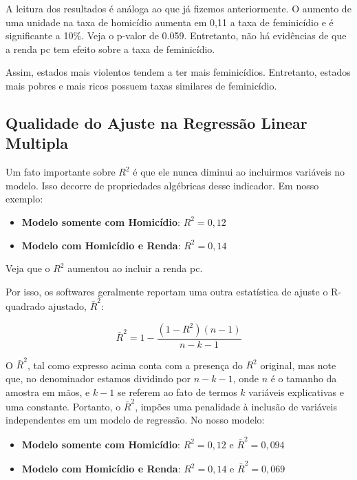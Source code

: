 \documentclass[
  letterpaper,
  DIV=11,
  numbers=noendperiod]{scrreprt}
\providecommand{\tightlist}{%
  \setlength{\itemsep}{0pt}\setlength{\parskip}{0pt}}
\begin{document}
A leitura dos resultados é análoga ao que já fizemos anteriormente. O
aumento de uma unidade na taxa de homicídio aumenta em 0,11 a taxa de
feminicídio e é significante a 10\%. Veja o p-valor de 0.059.
Entretanto, não há evidências de que a renda pc tem efeito sobre a taxa
de feminicídio.

Assim, estados mais violentos tendem a ter mais feminicídios.
Entretanto, estados mais pobres e mais ricos possuem taxas similares de
feminicídio.

\subsection{Qualidade do Ajuste na Regressão Linear
Multipla}\label{qualidade-do-ajuste-na-regressuxe3o-linear-multipla}

Um fato importante sobre \(R^2\) é que ele nunca diminui ao incluirmos
variáveis no modelo. Isso decorre de propriedades algébricas desse
indicador. Em nosso exemplo:

\begin{itemize}
\tightlist
\item
  \textbf{Modelo somente com Homicídio}: \(R^2=0,12\)
\item
  \textbf{Modelo com Homicídio e Renda}: \(R^2=0,14\)
\end{itemize}

Veja que o \(R^2\) aumentou ao incluir a renda pc.

Por isso, os softwares geralmente reportam uma outra estatística de
ajuste o R-quadrado ajustado, \(\bar{R}^2\):

\[\bar{R}^2 = 1 - \frac{(1 - R^2)(n - 1)}{n - k - 1}\]

O \(\bar{R}^2\), tal como expresso acima conta com a presença do \(R^2\)
original, mas note que, no denominador estamos dividindo por \(n-k-1\),
onde \(n\) é o tamanho da amostra em mãos, e \(k-1\) se referem ao fato
de termos \(k\) variáveis explicativas e uma constante. Portanto, o
\(\bar{R}^2\), impões uma penalidade à inclusão de variáveis
independentes em um modelo de regressão. No nosso modelo:

\begin{itemize}
\tightlist
\item
  \textbf{Modelo somente com Homicídio}: \(R^2=0,12\) e
  \(\bar{R}^2= 0,094\)
\item
  \textbf{Modelo com Homicídio e Renda}: \(R^2=0,14\) e
  \(\bar{R}^2= 0,069\)
\end{itemize}
\end{document}
